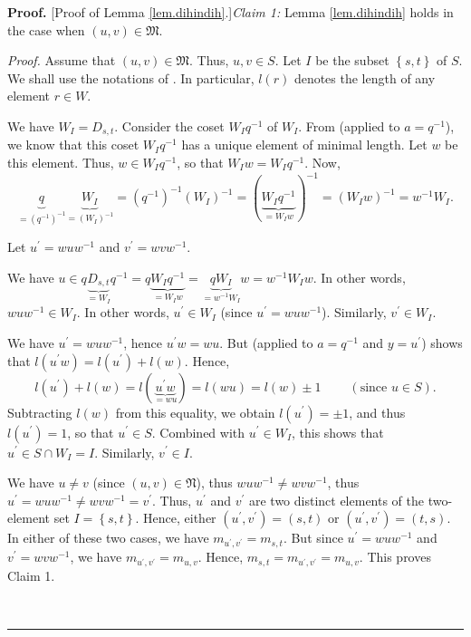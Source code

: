 \documentclass[numbers=enddot,12pt,final,onecolumn,notitlepage,abstracton]{scrartcl}%
\theoremstyle{definition}
\newenvironment{proof}[1][Proof]{\noindent\textbf{#1.} }{\ \rule{0.5em}{0.5em}}
\begin{document}
\begin{proof}
[Proof of Lemma \ref{lem.dihindih}.]\textit{Claim 1:} Lemma \ref{lem.dihindih}
holds in the case when $\left(  u,v\right)  \in\mathfrak{M}$.

\textit{Proof.} Assume that $\left(  u,v\right)  \in\mathfrak{M}$. Thus,
$u,v\in S$. Let $I$ be the subset $\left\{  s,t\right\}  $ of $S$. We shall
use the notations of \cite[\S 9]{Lusztig-Hecke}. In particular, $l\left(
r\right)  $ denotes the length of any element $r\in W$.

We have $W_{I}=D_{s,t}$. Consider the coset $W_{I}q^{-1}$ of $W_{I}$. From
\cite[Lemma 9.7 (a)]{Lusztig-Hecke} (applied to $a=q^{-1}$), we know that this
coset $W_{I}q^{-1}$ has a unique element of minimal length. Let $w$ be this
element. Thus, $w\in W_{I}q^{-1}$, so that $W_{I}w=W_{I}q^{-1}$. Now,
\[
\underbrace{q}_{=\left(  q^{-1}\right)  ^{-1}}\underbrace{W_{I}}_{=\left(
W_{I}\right)  ^{-1}}=\left(  q^{-1}\right)  ^{-1}\left(  W_{I}\right)
^{-1}=\left(  \underbrace{W_{I}q^{-1}}_{=W_{I}w}\right)  ^{-1}=\left(
W_{I}w\right)  ^{-1}=w^{-1}W_{I}.
\]


Let $u^{\prime}=wuw^{-1}$ and $v^{\prime}=wvw^{-1}$.

We have $u\in q\underbrace{D_{s,t}}_{=W_{I}}q^{-1}=q\underbrace{W_{I}q^{-1}%
}_{=W_{I}w}=\underbrace{qW_{I}}_{=w^{-1}W_{I}}w=w^{-1}W_{I}w$. In other words,
$wuw^{-1}\in W_{I}$. In other words, $u^{\prime}\in W_{I}$ (since $u^{\prime
}=wuw^{-1}$). Similarly, $v^{\prime}\in W_{I}$.

We have $u^{\prime}=wuw^{-1}$, hence $u^{\prime}w=wu$. But \cite[Lemma 9.7
(b)]{Lusztig-Hecke} (applied to $a=q^{-1}$ and $y=u^{\prime}$) shows that
$l\left(  u^{\prime}w\right)  =l\left(  u^{\prime}\right)  +l\left(  w\right)
$. Hence,
\[
l\left(  u^{\prime}\right)  +l\left(  w\right)  =l\left(
\underbrace{u^{\prime}w}_{=wu}\right)  =l\left(  wu\right)  =l\left(
w\right)  \pm1\ \ \ \ \ \ \ \ \ \ \left(  \text{since }u\in S\right)  .
\]
Subtracting $l\left(  w\right)  $ from this equality, we obtain $l\left(
u^{\prime}\right)  =\pm1$, and thus $l\left(  u^{\prime}\right)  =1$, so that
$u^{\prime}\in S$. Combined with $u^{\prime}\in W_{I}$, this shows that
$u^{\prime}\in S\cap W_{I}=I$. Similarly, $v^{\prime}\in I$.

We have $u\neq v$ (since $\left(  u,v\right)  \in\mathfrak{N}$), thus
$wuw^{-1}\neq wvw^{-1}$, thus $u^{\prime}=wuw^{-1}\neq wvw^{-1}=v^{\prime}$.
Thus, $u^{\prime}$ and $v^{\prime}$ are two distinct elements of the
two-element set $I=\left\{  s,t\right\}  $. Hence, either $\left(  u^{\prime
},v^{\prime}\right)  =\left(  s,t\right)  $ or $\left(  u^{\prime},v^{\prime
}\right)  =\left(  t,s\right)  $. In either of these two cases, we have
$m_{u^{\prime},v^{\prime}}=m_{s,t}$. But since $u^{\prime}=wuw^{-1}$ and
$v^{\prime}=wvw^{-1}$, we have $m_{u^{\prime},v^{\prime}}=m_{u,v}$. Hence,
$m_{s,t}=m_{u^{\prime},v^{\prime}}=m_{u,v}$. This proves Claim 1.


\end{proof}
\end{document}
